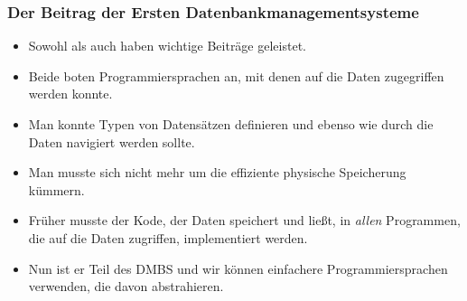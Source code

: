 \documentclass[aspectratio=169,mathserif,notheorems]{beamer}%
\begin{document}
\begin{frame}%
\frametitle{Der Beitrag der Ersten Datenbankmanagementsysteme}%
\begin{itemize}%
\item Sowohl  als auch  haben wichtige Beiträge geleistet.%
\item<2-> Beide boten Programmiersprachen an, mit denen auf die Daten zugegriffen werden konnte.%
\item<3-> Man konnte Typen von Datensätzen definieren und ebenso wie durch die Daten navigiert werden sollte.%
\item<4-> Man musste sich nicht mehr um die effiziente physische Speicherung kümmern.%
\item<5-> Früher musste der Kode, der Daten speichert und ließt, in \emph{allen} Programmen, die auf die Daten zugriffen, implementiert werden.%
\item<6-> Nun ist er Teil des DMBS und wir können einfachere Programmiersprachen verwenden, die davon abstrahieren.%
\end{itemize}%
\end{frame}%
%
\end{document}
